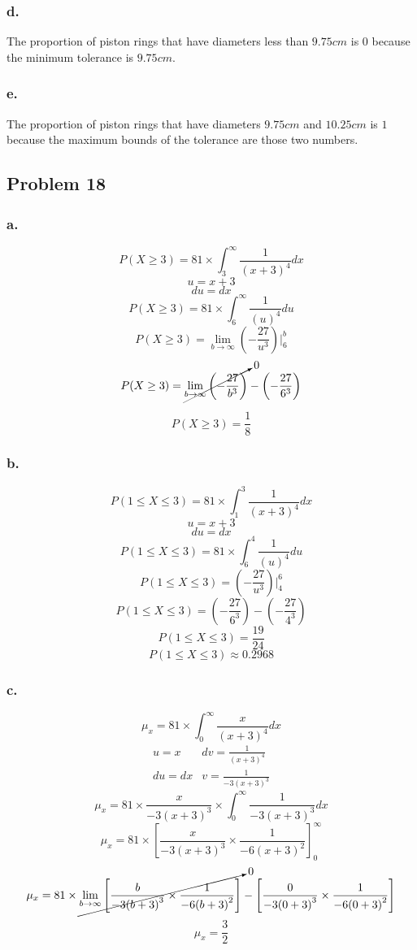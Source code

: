 \documentclass[11pt]{article}
\begin{document}
\subsubsection*{d.}
The proportion of piston rings that have diameters less than $9.75 cm$ is $0$
because the minimum tolerance is $9.75 cm$. 

\subsubsection*{e.}
The proportion of piston rings that have diameters $9.75 cm$ and $10.25 cm$ is
$1$ because the maximum bounds of the tolerance are those two numbers. 

\subsection*{Problem 18}
\subsubsection*{a.}
\[ P(X \ge 3) = 81 \times \int_{3}^{\infty} \frac{1}{{(x+3)}^4} dx \]
\[ u = x + 3 \]
\[ du = dx \]
\[ P(X \ge 3) = 81 \times \int_{6}^{\infty} \frac{1}{{(u)}^4} du \]
\[ P(X \ge 3) = \lim_{b \to \infty} \left( -\frac{27}{u^3} \right) \bigg \vert^b_6\]
\[ P(X \ge 3) = \cancelto{0}{\lim_{b \to \infty} \left( -\frac{27}{b^3} \right)}
              - \left( -\frac{27}{6^3} \right)\]

\[ P(X \ge 3) = \frac{1}{8} \]
\subsubsection*{b.}
\[ P(1 \le X \le 3) = 81 \times \int_{1}^{3} \frac{1}{{(x+3)}^4} dx \]
\[ u = x + 3 \]
\[ du = dx \]
\[ P(1 \le X \le 3) = 81 \times \int_{6}^{4} \frac{1}{{(u)}^4} du \]
\[ P(1 \le X \le 3) = \left(- \frac{27}{u^3} \right) \bigg \vert_4^6 \]
\[ P(1 \le X \le 3) = \left(- \frac{27}{6^3} \right) - \left(- \frac{27}{4^3} \right) \]
\[ P(1 \le X \le 3) = \frac{19}{24} \]
\[ P(1 \le X \le 3) \approx 0.2968 \]

\subsubsection*{c.}
\[ \mu_x = 81 \times \int_{0}^{\infty} \frac{x}{{(x+3)}^4} dx \]
\[
    \begin{array}{ll}
        u = x & dv = \frac{1}{{(x+3)}^4} \\
        du = dx & v = \frac{1}{-3{(x+3)}^3}
    \end{array} 
\]
\[ \mu_x = 81 \times \frac{x}{-3{(x+3)}^3} \times
            \int_{0}^{\infty} \frac{1}{-3{(x+3)}^3} dx \]
\[ \mu_x = 81 \times { \left[ \frac{x}{-3{(x+3)}^3} \times
    \frac{1}{-6{(x+3)}^2}\right] }_0^{\infty} \]
\[ \mu_x = 81 \times \cancelto{0}{\lim_{b \to \infty}  
        \left[ \frac{b}{-3{(b+3)}^3} \times \frac{1}{-6{(b+3)}^2}\right]
    } - {
        \left[ \frac{0}{-3{(0+3)}^3} \times \frac{1}{-6{(0+3)}^2}\right] 
    }
\]
\[ \mu_x = \frac{3}{2} \]
\end{document}
